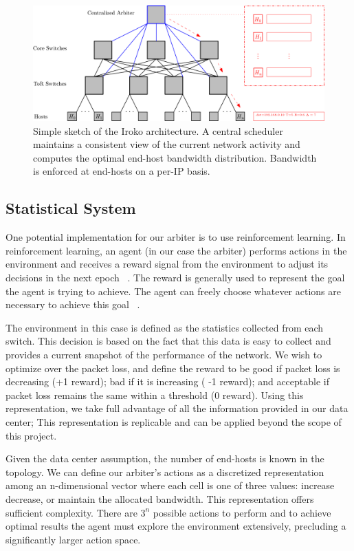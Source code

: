 \documentclass[sigconf]{acmart}
\begin{document}
\begin{figure}
\centering
\includegraphics[width=1\linewidth]{Topology3}
\caption{Simple sketch of the Iroko architecture. A central scheduler maintains a consistent view of the current network activity and computes the optimal end-host bandwidth distribution. Bandwidth is enforced at end-hosts on a per-IP basis.}
\label{fig:Topology3}
\end{figure}

\subsection{Statistical System}
One potential implementation for our arbiter is to use reinforcement learning. In reinforcement learning, an agent (in our case the arbiter) performs actions in the environment and receives a reward signal from the environment to adjust its decisions in the next epoch ~\cite{Sutton:1998:IRL:551283}. The reward is generally used to represent the goal the agent is trying to achieve. The agent can freely choose whatever actions are necessary to achieve this goal ~\cite{Sutton:1998:IRL:551283}.

The environment in this case is defined as the statistics collected from each switch. This decision is based on the fact that this data is easy to collect and provides a current snapshot of the performance of the network. We wish to optimize over the packet loss, and define the reward to be good if packet loss is decreasing (+1 reward); bad if it is increasing ( -1 reward); and acceptable if packet loss remains the same within a threshold (0 reward). Using this representation, we take full advantage of all the information provided in our data center; This representation is replicable and can be applied beyond the scope of this project.
 
Given the data center assumption, the number of end-hosts is known in the topology. We can define our arbiter's actions as a discretized representation among an n-dimensional vector where each cell is one of three values: increase decrease, or maintain the allocated bandwidth. This representation offers sufficient complexity. There are $3^n$ possible actions to perform and to achieve optimal results the agent must explore the environment extensively, precluding a significantly larger action space.
\end{document}
